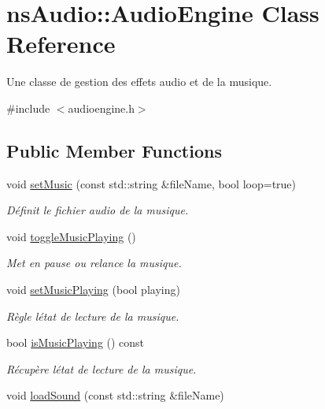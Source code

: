 \hypertarget{classns_audio_1_1_audio_engine}{}\section{ns\+Audio\+:\+:Audio\+Engine Class Reference}
\label{classns_audio_1_1_audio_engine}


Une classe de gestion des effets audio et de la musique.  




{\ttfamily \#include $<$audioengine.\+h$>$}

\subsection*{Public Member Functions}
\begin{DoxyCompactItemize}
\item 
void \hyperlink{classns_audio_1_1_audio_engine_a6ef72eb80bef2c1b0764c40f629d2536}{set\+Music} (const std\+::string \&file\+Name, bool loop=true)
\begin{DoxyCompactList}\small\item\em Définit le fichier audio de la musique. \end{DoxyCompactList}\item 
void \hyperlink{classns_audio_1_1_audio_engine_aba89263fc9f810bee40dcae229313883}{toggle\+Music\+Playing} ()
\begin{DoxyCompactList}\small\item\em Met en pause ou relance la musique. \end{DoxyCompactList}\item 
void \hyperlink{classns_audio_1_1_audio_engine_ac21b2c1be9590a0f702c48220c59f8c9}{set\+Music\+Playing} (bool playing)
\begin{DoxyCompactList}\small\item\em Règle l\textquotesingle{}état de lecture de la musique. \end{DoxyCompactList}\item 
bool \hyperlink{classns_audio_1_1_audio_engine_a57e13380a3039e546a5f1b9242f8709b}{is\+Music\+Playing} () const
\begin{DoxyCompactList}\small\item\em Récupère l\textquotesingle{}état de lecture de la musique. \end{DoxyCompactList}\item 
void \hyperlink{classns_audio_1_1_audio_engine_a4c88595136327b3805c0322a9a8d2a0f}{load\+Sound} (const std\+::string \&file\+Name)

\end{DoxyCompactItemize}
